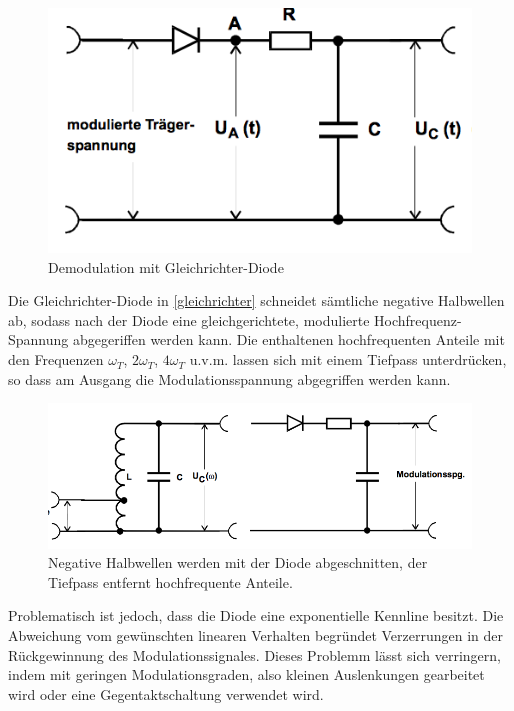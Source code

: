 \begin{figure}
	\centering
	\includegraphics[width=\textwidth]{img/Abb9.png}
	\caption{Demodulation mit Gleichrichter-Diode \cite{FP}}
	\label{fig:9}
\end{figure}

Die Gleichrichter-Diode in \autoref{gleichrichter} schneidet sämtliche negative Halbwellen ab, sodass nach der Diode eine gleichgerichtete, modulierte Hochfrequenz-Spannung abgegeriffen werden kann. Die enthaltenen hochfrequenten Anteile mit den Frequenzen $\omega_T$, $2\omega_T$,
$4\omega_T$ u.v.m. lassen sich mit einem Tiefpass unterdrücken, so dass am Ausgang die Modulationsspannung abgegriffen werden kann.

\begin{figure}
	\centering
	\includegraphics[width=\textwidth]{img/Abb12.png}
	\caption{Negative Halbwellen werden mit der Diode abgeschnitten, der Tiefpass entfernt hochfrequente Anteile. \cite{FP}}
	\label{gleichrichter}
\end{figure}

Problematisch ist jedoch, dass die Diode eine exponentielle Kennline besitzt. Die Abweichung vom gewünschten linearen Verhalten begründet Verzerrungen in der Rückgewinnung des Modulationssignales. Dieses Problemm lässt sich verringern, indem mit geringen Modulationsgraden, also kleinen Auslenkungen gearbeitet wird oder eine Gegentaktschaltung verwendet wird.

